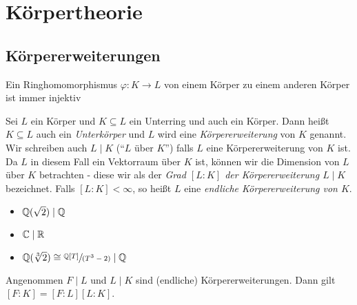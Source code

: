 \graphicspath{{Images/}}

\chapter{Körpertheorie}

\section{Körpererweiterungen}
\begin{remark}
	Ein Ringhomomorphismus $\varphi: K \to L$ von einem Körper zu einem anderen Körper ist immer injektiv 
\end{remark}

\begin{definition}
	Sei $L$ ein Körper und $K \subseteq L$ ein Unterring und auch ein Körper.
	Dann heißt $K \subseteq L$ auch ein \emph{Unterkörper} und $L$ wird eine \emph{Körpererweiterung} von  $K$ genannt.
	Wir schreiben auch $L \mid K$ (\enquote{$L$ über $K$}) falls $L$ eine Körpererweiterung von $K$ ist.
	Da $L$ in diesem Fall ein Vektorraum über $K$ ist, können wir die Dimension von $L$ über $K$ betrachten -
	diese wir als der \emph{Grad $[L:K]$ der Körpererweiterung  $L \mid K$} bezeichnet.
	Falls $[L:K] < \infty$, so heißt $L$ eine \emph{endliche Körpererweiterung von $K$}.
\end{definition}

\begin{eg}
	\begin{itemize}
		\item $\mathbb{Q}(\sqrt{2}) \mid \mathbb{Q}$
		\item $\mathbb{C} \mid \mathbb{R}$ 
		\item $\mathbb{Q}(\sqrt[3]{2} ) \cong \sfrac[3]{\mathbb{Q}[T]}{(T^3-2)} \mid \mathbb{Q} $
	\end{itemize}
\end{eg}

\begin{theorem}
	Angenommen $F \mid L $ und $L \mid K$ sind (endliche) Körpererweiterungen.
	Dann gilt $[F:K] = [F:L] [L:K]$.
\end{theorem}

